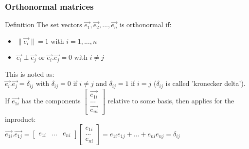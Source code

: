 \begin{frame}
	\frametitle{Orthonormal matrices}
	\begin{block}{Definition}
		The set vectors $\overrightarrow{e_1},\overrightarrow{e_2},...,\overrightarrow{e_n}$ is orthonormal if:
		\begin{itemize}
			\item $\|\overrightarrow{e_i}\|=1$ with $i=1,...,n$
			\item $\overrightarrow{e_i}\perp\overrightarrow{e_j}$ or $\overrightarrow{e_i}.\overrightarrow{e_j}=0$ with $i\neq j$
		\end{itemize}
		This is noted as:\\
		$\overrightarrow{e_i}.\overrightarrow{e_j}=\delta_{ij}$ with $\delta_{ij}=0$ if $i\neq j$ and $\delta_{ij}=1$ if $i=j$ ($\delta_{ij}$ is called 'kronecker delta').\\
		If $\overrightarrow{e_{1i}}$ has the components $\begin{bmatrix} \overrightarrow{e_{1i}}\\...\\\overrightarrow{e_{ni}}\end{bmatrix}$ relative to some basis, then applies for the inproduct:\\
		$\overrightarrow{e_{1i}}.\overrightarrow{e_{1j}}=\begin{bmatrix} e_{1i} & ... & e_{ni}\end{bmatrix} \begin{bmatrix} e_{1i}\\...\\e_{ni}\end{bmatrix}=e_{1i}e_{1j}+...+e_{ni}e_{nj}=\delta_{ij}$
	\end{block}
\end{frame}

